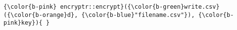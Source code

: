 \documentclass[class=minimal,border=0]{standalone}
\begin{document}
%
\begin{BVerbatim}[bgcolor=b-darkgrey]
{\color{b-pink} encryptr::encrypt}({\color{b-green}write.csv}({\color{b-orange}d}, {\color{b-blue}"filename.csv"}), {\color{b-pink}key}){ }
\end{BVerbatim}
\end{document}
